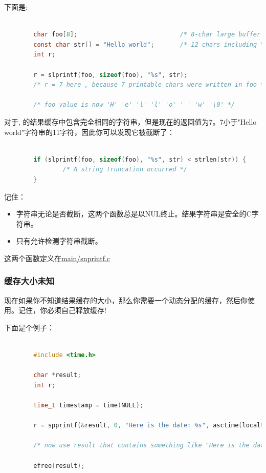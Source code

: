 下面是:

\begin{lstlisting}[language=c]

        char foo[8];                            /* 8-char large buffer */
        const char str[] = "Hello world";       /* 12 chars including \0 in count */
        int r;
        
        r = slprintf(foo, sizeof(foo), "%s", str);
        /* r = 7 here , because 7 printable chars were written in foo */
        
        /* foo value is now 'H' 'e' 'l' 'l' 'o' ' ' 'w' '\0' */

\end{lstlisting}         


对于, 的结果缓存中包含完全相同的字符串，但是现在的返回值为7。7小于"Hello world"字符串的11字符，因此你可以发现它被截断了：

\begin{lstlisting}[language=c]

        if (slprintf(foo, sizeof(foo), "%s", str) < strlen(str)) {
                /* A string truncation occurred */
        }

\end{lstlisting} 

记住：

\begin{itemize}
        \item 字符串无论是否截断，这两个函数总是以NUL终止。结果字符串是安全的C字符串。
        \item 只有允许检测字符串截断。
\end{itemize}  


这两个函数定义在\href{https://github.com/php/php-src/blob/648be8600ff89e1b0e4a4ad25cebad42b53bed6d/main/snprintf.c}{main/snprintf.c}


\subsubsection{缓存大小未知}

现在如果你不知道结果缓存的大小，那么你需要一个动态分配的缓存，然后你使用。记住，你必须自己释放缓存!

下面是个例子：

\begin{lstlisting}[language=c]

        #include <time.h>

        char *result;
        int r;
        
        time_t timestamp = time(NULL);
        
        r = spprintf(&result, 0, "Here is the date: %s", asctime(localtime(&timestamp)));
        
        /* now use result that contains something like "Here is the date: Thu Jun 15 19:12:51 2017\n" */
        
        efree(result);  

\end{lstlisting} 


